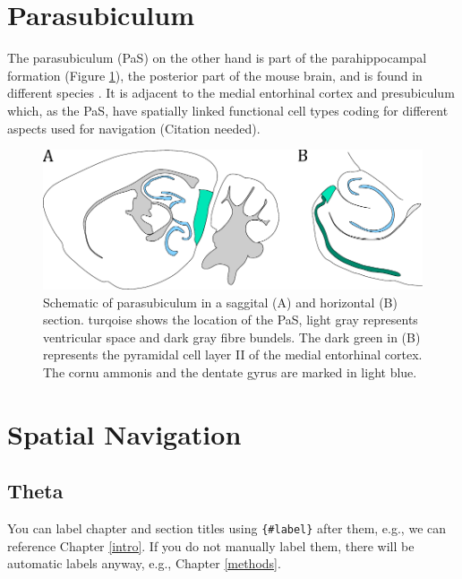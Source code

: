 \documentclass[
  12pt,
]{book}
\begin{document}
\hypertarget{parasubiculum}{%
\section{Parasubiculum}\label{parasubiculum}}

The parasubiculum (PaS) on the other hand is part of the parahippocampal formation (Figure \ref{fig:PaS-Scheme}), the posterior part of the mouse brain, and is found in different species \citep{ding_comparative_2013}.
It is adjacent to the medial entorhinal cortex and presubiculum which, as the PaS, have spatially linked functional cell types coding for different aspects used for navigation (Citation needed).

\begin{figure}[H]
\includegraphics[width=0.9\linewidth,height=0.9\textheight]{Figures/Schemes/PaS_schematic} \caption{Schematic of parasubiculum in a saggital (A) and horizontal (B) section. turqoise shows the location of the PaS, light gray represents ventricular space and dark gray fibre bundels. The dark green in (B) represents the pyramidal cell layer II of the medial entorhinal cortex. The cornu ammonis and the dentate gyrus are marked in light blue.}\label{fig:PaS-Scheme}
\end{figure}

\hypertarget{spatial-navigation}{%
\section{Spatial Navigation}\label{spatial-navigation}}

\hypertarget{theta-1}{%
\subsection{Theta}\label{theta-1}}

You can label chapter and section titles using \texttt{\{\#label\}} after them, e.g., we can reference Chapter \ref{intro}. If you do not manually label them, there will be automatic labels anyway, e.g., Chapter \ref{methods}.
\end{document}
